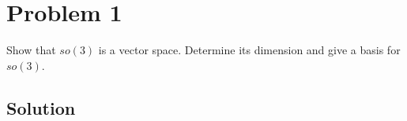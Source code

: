 \section*{Problem 1}

Show that \( so(3) \) is a vector space.
Determine its dimension and give a basis for \( so(3) \).

\subsection*{Solution}
